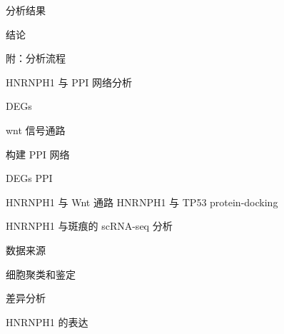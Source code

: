 \documentclass[
  ignorenonframetext,
]{beamer}
\begin{document}
\begin{frame}{分析结果}
\protect\hypertarget{results}{}
\end{frame}

\begin{frame}{结论}
\protect\hypertarget{dis}{}
\end{frame}

\begin{frame}{附：分析流程}
\protect\hypertarget{workflow}{}
\begin{block}{HNRNPH1 与 PPI 网络分析}
\protect\hypertarget{hnrnph1-ux4e0e-ppi-ux7f51ux7edcux5206ux6790}{}
\begin{block}{DEGs}
\protect\hypertarget{degs}{}
\end{block}

\begin{block}{wnt 信号通路}
\protect\hypertarget{wnt-ux4fe1ux53f7ux901aux8def}{}
\end{block}

\begin{block}{构建 PPI 网络}
\protect\hypertarget{ux6784ux5efa-ppi-ux7f51ux7edc}{}
\begin{block}{DEGs PPI}
\protect\hypertarget{degs-ppi}{}
\end{block}

\begin{block}{HNRNPH1 与 Wnt 通路}
\protect\hypertarget{hnrnph1-ux4e0e-wnt-ux901aux8def}{}
HNRNPH1 与 TP53 protein-docking
\end{block}
\end{block}
\end{block}

\begin{block}{HNRNPH1 与斑痕的 scRNA-seq 分析}
\protect\hypertarget{hnrnph1-ux4e0eux6591ux75d5ux7684-scrna-seq-ux5206ux6790}{}
\begin{block}{数据来源}
\protect\hypertarget{ux6570ux636eux6765ux6e90}{}
\end{block}

\begin{block}{细胞聚类和鉴定}
\protect\hypertarget{ux7ec6ux80deux805aux7c7bux548cux9274ux5b9a}{}
\end{block}

\begin{block}{差异分析}
\protect\hypertarget{ux5deeux5f02ux5206ux6790}{}
\begin{block}{HNRNPH1 的表达}
\protect\hypertarget{hnrnph1-ux7684ux8868ux8fbe}{}
\end{block}


\end{block}
\end{block}
\end{frame}
\end{document}
